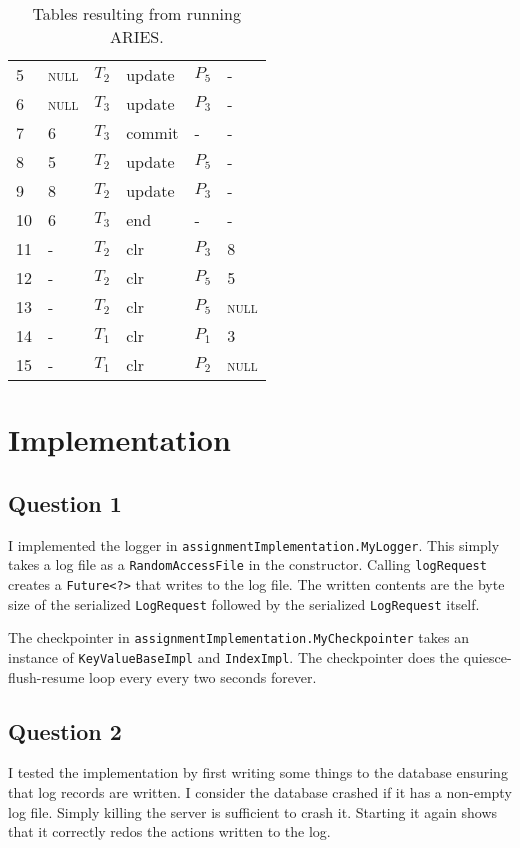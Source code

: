 \documentclass[a4paper]{article}
\newcommand{\mynull}{\textsc{null}}
\begin{document}
\begin{table}[h]
{\begin{tabular}{l|l|l|l|l|l}
            5 & \mynull & $T_2$ & update & $P_5$ & - \\
            6 & \mynull & $T_3$ & update & $P_3$ & - \\
            7 & 6 & $T_3$ & commit & - & - \\
            8 & 5 & $T_2$ & update & $P_5$ & - \\
            9 & 8 & $T_2$ & update & $P_3$ & - \\
            10 & 6 & $T_3$ & end & - & - \\
            11 & - & $T_2$ & clr & $P_3$ & 8 \\
            12 & - & $T_2$ & clr & $P_5$ & 5 \\
            13 & - & $T_2$ & clr & $P_5$ & \mynull \\
            14 & - & $T_1$ & clr & $P_1$ & 3 \\
            15 & - & $T_1$ & clr & $P_2$ & \mynull \\
            \bottomrule
        \end{tabular}
    }
    \caption{Tables resulting from running ARIES.}
\end{table}

\section{Implementation}

\subsection{Question 1}

I implemented the logger in \texttt{assignmentImplementation.MyLogger}. This
simply takes a log file as a \texttt{RandomAccessFile} in the constructor.
Calling \texttt{logRequest} creates a \texttt{Future<?>} that writes to the log
file. The written contents are the byte size of the serialized
\texttt{LogRequest} followed by the serialized \texttt{LogRequest} itself.

The checkpointer in \texttt{assignmentImplementation.MyCheckpointer} takes an
instance of \texttt{KeyValueBaseImpl} and \texttt{IndexImpl}. The checkpointer
does the quiesce-flush-resume loop every every two seconds forever.

\subsection{Question 2}

I tested the implementation by first writing some things to the database
ensuring that log records are written. I consider the database crashed if it
has a non-empty log file. Simply killing the server is sufficient to crash it.
Starting it again shows that it correctly redos the actions written to the log.
\end{document}
